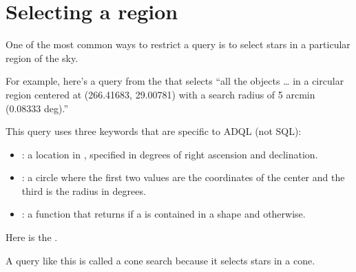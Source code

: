 \documentclass[letterpaper,10pt,english]{sphinxmanual}
\begin{document}
\section{Selecting a region}
\label{\detokenize{02_coords:selecting-a-region}}
One of the most common ways to restrict a query is to select stars in a particular region of the sky.

For example, here’s a query from the  that selects “all the objects … in a circular region centered at (266.41683, \sphinxhyphen{}29.00781) with a search radius of 5 arcmin (0.08333 deg).”

\begin{sphinxVerbatim}[commandchars=\\\{\}]
  
\end{sphinxVerbatim}

This query uses three keywords that are specific to ADQL (not SQL):
\begin{itemize}
\item {} 
: a location in , specified in degrees of right ascension and declination.

\item {} 
: a circle where the first two values are the coordinates of the center and the third is the radius in degrees.

\item {} 
: a function that returns  if a  is contained in a shape and  otherwise.

\end{itemize}

Here is the .

A query like this is called a cone search because it selects stars in a cone.
\end{document}
